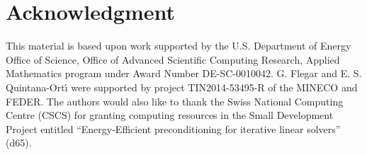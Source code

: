 \section*{Acknowledgment}

This material is based upon work supported by the U.S. Department
of Energy Office of Science, Office of Advanced Scientific Computing
Research, Applied Mathematics program under Award Number
DE-SC-0010042.
G. Flegar and E. S. Quintana-Ort\'{\i} were supported
by project TIN2014-53495-R of the MINECO and FEDER.
The authors would also like to thank the Swiss National Computing Centre (CSCS)
for granting computing resources in the Small Development Project entitled ``Energy-Efficient
preconditioning for iterative linear solvers'' (d65). 

